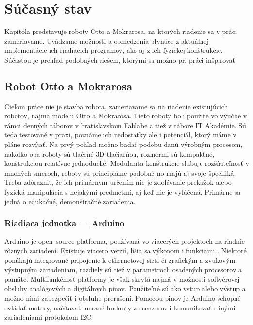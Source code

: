 \chapter{Súčasný stav}

\label{kap:vychodisko}

Kapitola predstavuje roboty Otto a Mokrarosa, na ktorých riadenie sa v práci zameriavame. Uvádzame možnosti a obmedzenia plynúce z aktuálnej implementácie ich riadiacich programov, ako aj z ich fyzickej konštrukcie. Súčasťou je prehľad podobných riešení, ktorými sa možno pri práci inšpirovať.

\section{Robot Otto a Mokrarosa}
\label{sec:OttoMokrarosa}
Cieľom práce nie je stavba robota, zameriavame sa na riadenie existujúcich robotov, najmä modelu Otto a Mokrarosa. Tieto roboty boli použité vo výučbe v rámci denných táborov v bratislavskom Fablabe a tiež v tábore IT Akadémie. Sú teda testované v praxi, poznáme ich nedostatky ale i potenciál, ktorý máme v pláne rozvíjať. Na prvý pohľad možno badať podobu danú výrobným procesom, nakoľko oba roboty sú tlačené 3D tlačiarňou, rozmermi sú kompaktné, konštrukciou relatívne jednoduché. Modularita konštrukcie sľubuje rozšíriteľnosť v mnohých smeroch, roboty sú principiálne podobné no majú aj svoje špecifiká. Treba zdôrazniť, že ich primárnym určením nie je zdolávanie prekážok alebo fyzická manipulácia s nejakými predmetmi, aj keď nie je vylúčená. Primárne sa jedná o edukačné, demonštračné zariadenia.

\subsection{Riadiaca jednotka --- Arduino}
\label{sub:arduino}
Arduino je open--source platforma, používaná vo viacerých projektoch na riadnie rôznych zariadení. Existuje viacero verzií, líšia sa výkonom i funkciami \cite{ArduinoConcept}. Niektoré ponúkajú integrované pripojenie k ethernetovej sieti či grafickým a zvukovým výstupným zariadeniam, rozdiely sú tiež v parametroch osadených procesorov a pamäte. Multifunkčnosť platformy je však skrytá najmä v možnosti softvérovej obsluhy analógových a digitálnych pinov. Použiteľné sú ako vstup alebo výstup a možno nimi zabezpečiť i obsluhu prerušení. Pomocou pinov je Arduino schopné ovládať motory, načítavať merané hodnoty zo senzorov i komunikovať s inými zariadeniami protokolom I2C.


